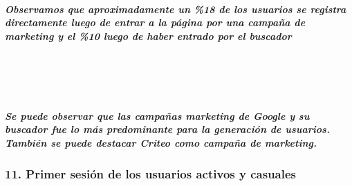 \documentclass[11pt]{article}
\begin{document}
    \hypertarget{observamos-que-aproximadamente-un-18-de-los-usuarios-se-registra-directamente-luego-de-entrar-a-la-puxe1gina-por-una-campauxf1a-de-marketing-y-el-10-luego-de-haber-entrado-por-el-buscador}{%
\subparagraph{Observamos que aproximadamente un \%18 de los usuarios se
registra directamente luego de entrar a la página por una campaña de
marketing y el \%10 luego de haber entrado por el
buscador}\label{observamos-que-aproximadamente-un-18-de-los-usuarios-se-registra-directamente-luego-de-entrar-a-la-puxe1gina-por-una-campauxf1a-de-marketing-y-el-10-luego-de-haber-entrado-por-el-buscador}}

   
    \begin{center}
    \end{center}
    { \hspace*{\fill} \\}
    
    \begin{center}
    \end{center}
    { \hspace*{\fill} \\}
    
    \hypertarget{se-puede-observar-que-las-campauxf1as-marketing-de-google-y-su-buscador-fue-lo-muxe1s-predominante-para-la-generaciuxf3n-de-usuarios.-tambiuxe9n-se-puede-destacar-criteo-como-campauxf1a-de-marketing.}{%
\subparagraph{Se puede observar que las campañas marketing de Google y
su buscador fue lo más predominante para la generación de usuarios.
También se puede destacar Criteo como campaña de
marketing.}\label{se-puede-observar-que-las-campauxf1as-marketing-de-google-y-su-buscador-fue-lo-muxe1s-predominante-para-la-generaciuxf3n-de-usuarios.-tambiuxe9n-se-puede-destacar-criteo-como-campauxf1a-de-marketing.}}

    \hypertarget{primer-sesiuxf3n-de-los-usuarios-activos-y-casuales}{%
\subsubsection{11. Primer sesión de los usuarios activos y
casuales}\label{primer-sesiuxf3n-de-los-usuarios-activos-y-casuales}}

    \begin{center}
    \end{center}
    { \hspace*{\fill} \\}
    
\end{document}
